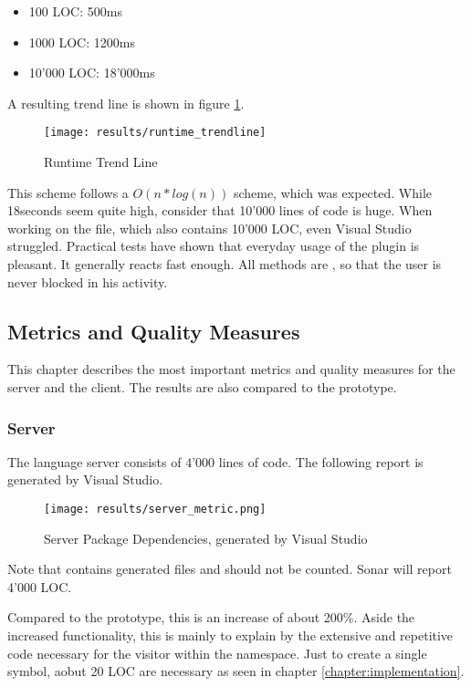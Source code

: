 \begin{itemize}
    \item 100 LOC: 500ms
    \item 1000 LOC: 1200ms
    \item 10'000 LOC: 18'000ms
\end{itemize}

A resulting trend line is shown in figure \ref{fig:trendline_1}.

\begin{figure}[H]
    \centering
    \texttt{[image: results/runtime\_trendline]}
    \caption{Runtime Trend Line}
    \label{fig:trendline_1}
\end{figure}

This scheme follows a $O(n*log(n))$ scheme, which was expected.
While 18seconds seem quite high, consider that 10'000 lines of code is huge.
When working on the  file, which also contains 10'000 LOC, even Visual Studio struggled.
Practical tests have shown that everyday usage of the plugin is pleasant.
It generally reacts fast enough.
All methods are , so that the user is never blocked in his activity.

\subsection{Metrics and Quality Measures}
\label{section:results:metrics}
This chapter describes the most important metrics and quality measures for the server and the client.
The results are also compared to the prototype.

\subsubsection{Server}
The language server consists of 4'000 lines of code. The following report is generated by Visual Studio.
\begin{figure}[H]
    \centering
    \texttt{[image: results/server\_metric.png]}
    \caption{Server Package Dependencies, generated by Visual Studio}
    \label{fig:dependency_graph}
\end{figure}
Note that  contains generated files and should not be counted.
Sonar will report 4'000 LOC.

Compared to the prototype, this is an increase of about 200\%.
Aside the increased functionality, this is mainly to explain by the extensive and repetitive code necessary for the visitor within the  namespace.
Just to create a single symbol, aobut 20 LOC are necessary as seen in chapter \ref{chapter:implementation}.\\

